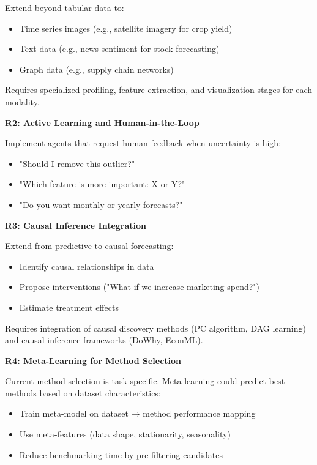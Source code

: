 \documentclass[11pt,a4paper]{article}
\begin{document}
Extend beyond tabular data to:
\begin{itemize}
    \item Time series images (e.g., satellite imagery for crop yield)
    \item Text data (e.g., news sentiment for stock forecasting)
    \item Graph data (e.g., supply chain networks)
\end{itemize}

Requires specialized profiling, feature extraction, and visualization stages for each modality.

\textbf{R2: Active Learning and Human-in-the-Loop}

Implement agents that request human feedback when uncertainty is high:
\begin{itemize}
    \item "Should I remove this outlier?"
    \item "Which feature is more important: X or Y?"
    \item "Do you want monthly or yearly forecasts?"
\end{itemize}

\textbf{R3: Causal Inference Integration}

Extend from predictive to causal forecasting:
\begin{itemize}
    \item Identify causal relationships in data
    \item Propose interventions ("What if we increase marketing spend?")
    \item Estimate treatment effects
\end{itemize}

Requires integration of causal discovery methods (PC algorithm, DAG learning) and causal inference frameworks (DoWhy, EconML).

\textbf{R4: Meta-Learning for Method Selection}

Current method selection is task-specific. Meta-learning could predict best methods based on dataset characteristics:
\begin{itemize}
    \item Train meta-model on dataset → method performance mapping
    \item Use meta-features (data shape, stationarity, seasonality)
    \item Reduce benchmarking time by pre-filtering candidates
\end{itemize}
\end{document}
